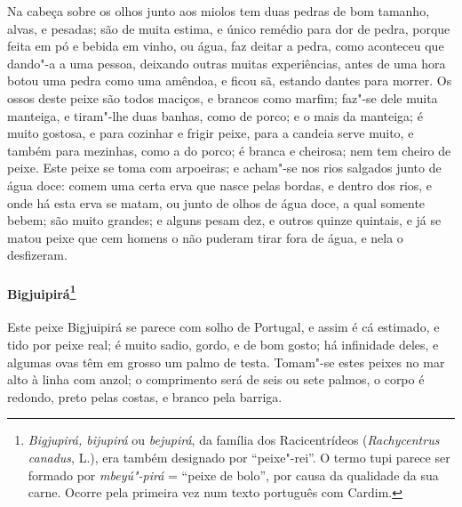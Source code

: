  Na cabeça sobre os olhos junto aos miolos tem duas pedras de bom
tamanho, alvas, e pesadas; são de muita estima, e único remédio para
dor de pedra, porque feita em pó e bebida em vinho, ou água, faz deitar
a pedra, como aconteceu que dando"-a a uma pessoa, deixando outras
muitas experiências, antes de uma hora botou uma pedra como uma
amêndoa, e ficou sã, estando dantes para morrer. Os ossos deste peixe
são todos maciços, e brancos como marfim; faz"-se dele muita manteiga,
e tiram"-lhe duas banhas, como de porco; e o mais da manteiga; é muito
gostosa, e para cozinhar e frigir peixe, para a candeia serve muito, e
também para mezinhas, como a do porco; é branca e cheirosa; nem tem
cheiro de peixe. Este peixe se toma com arpoeiras; e acham"-se nos rios
salgados junto de água doce: comem uma certa erva que nasce pelas
bordas, e dentro dos rios, e onde há esta erva se matam, ou junto de
olhos de água doce, a qual somente bebem; são muito grandes; e alguns
pesam dez, e outros quinze quintais, e já se matou peixe que cem
homens o não puderam tirar fora de água, e nela o desfizeram.

\paragraph{Bigjuipirá\footnote{ \textit{Bigjupirá, bijupirá} ou
\textit{bejupirá}, da família dos Racicentrídeos (\textit{Rachycentrus
canadus}, L.), era também designado por ``peixe"-rei''. O termo tupi
parece ser formado por \textit{mbeyú"-pirá} = ``peixe de bolo'', por causa
da qualidade da sua carne. Ocorre pela primeira vez num texto português
com Cardim.}} Este peixe Bigjuipirá se parece com solho de
Portugal, e assim é cá estimado, e tido por peixe real; é muito sadio,
gordo, e de bom gosto; há infinidade deles, e algumas ovas têm em
grosso um palmo de testa. Tomam"-se estes peixes no mar alto à linha
com anzol; o comprimento será de seis ou sete palmos, o corpo é
redondo, preto pelas costas, e branco pela barriga.

